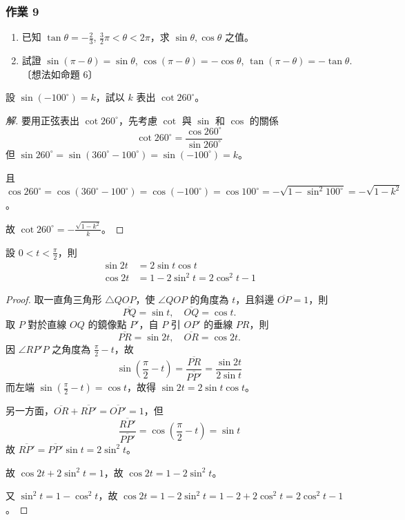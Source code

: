 \subsubsection*{作業 9}
\begin{enumerate}[label=\roman*), leftmargin=2.5em]
  \item 已知 $\tan\theta = -\frac{2}{3}$, $\frac{3}{2}\pi < \theta < 2\pi$，求 $\sin\theta, \cos\theta$ 之值。
  \item 試證 $\sin(\pi-\theta) = \sin\theta$, $\cos(\pi-\theta) = -\cos\theta$, $\tan(\pi-\theta) = -\tan\theta$.〔想法如命題 6〕
\end{enumerate}

\begin{example}
設 $\sin(-100^\circ) = k$，試以 $k$ 表出 $\cot 260^\circ$。
\end{example}

\begin{proof}[解]
要用正弦表出 $\cot 260^\circ$，先考慮 $\cot$ 與 $\sin$ 和 $\cos$ 的關係
\[ \cot 260^\circ = \frac{\cos 260^\circ}{\sin 260^\circ} \]
但 $\sin 260^\circ = \sin(360^\circ - 100^\circ) = \sin(-100^\circ) = k$。

且 $\cos 260^\circ = \cos(360^\circ - 100^\circ) = \cos(-100^\circ) = \cos 100^\circ = -\sqrt{1 - \sin^2 100^\circ} = -\sqrt{1 - k^2}$。

故 $\cot 260^\circ = -\frac{\sqrt{1 - k^2}}{k}$。\qedhere
\end{proof}

\begin{proposition}[銳角的倍角公式]
設 $0 < t < \frac{\pi}{2}$，則
\begin{align*}
\sin 2t &= 2\sin t\cos t \\
\cos 2t &= 1 - 2\sin^2 t = 2\cos^2 t - 1
\end{align*}
\end{proposition}

\begin{proof}
取一直角三角形 $\triangle QOP$，使 $\angle QOP$ 的角度為 $t$，且斜邊 $\overline{OP} = 1$，則
\[ \overline{PQ} = \sin t,\quad \overline{OQ} = \cos t. \]
取 $P$ 對於直線 $OQ$ 的鏡像點 $P'$，自 $P$ 引 $OP'$ 的垂線 $PR$，則
\[ \overline{PR} = \sin 2t,\quad \overline{OR} = \cos 2t. \]
因 $\angle RP'P$ 之角度為 $\frac{\pi}{2}-t$，故
\[ \sin\left(\frac{\pi}{2}-t\right) = \frac{\overline{PR}}{\overline{PP'}} = \frac{\sin 2t}{2\sin t} \]
而左端 $\sin\left(\frac{\pi}{2}-t\right) = \cos t$，故得 $\sin 2t = 2\sin t\cos t$。

另一方面，$\overline{OR} + \overline{RP'} = \overline{OP'} = 1$，但
\[ \frac{\overline{RP'}}{\overline{PP'}} = \cos\left(\frac{\pi}{2}-t\right) = \sin t \]
故 $\overline{RP'} = \overline{PP'}\sin t = 2\sin^2 t$。

故 $\cos 2t + 2\sin^2 t = 1$，故 $\cos 2t = 1 - 2\sin^2 t$。

又 $\sin^2 t = 1 - \cos^2 t$，故 $\cos 2t = 1 - 2\sin^2 t = 1 - 2 + 2\cos^2 t = 2\cos^2 t - 1$。
\end{proof}

